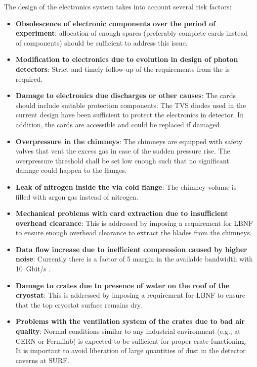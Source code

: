 The design of the \dual electronics system takes into account several risk factors:
\begin{itemize}
\item{\textbf{Obsolescence of electronic components over the period of experiment}: allocation of enough spares (preferably complete cards instead of components) should be sufficient to address this issue. }

\item{\textbf{Modification to  electronics due to evolution in design of photon detectors}: Strict and timely follow-up of the  requirements from the \dual {} is required.}

\item{\textbf{Damage to electronics due  discharges or other causes}: %
The  cards should include suitable protection components. The TVS diodes used in the current design  have been sufficient to protect the electronics in  detector. 
 In addition, the cards are accessible and could be replaced if damaged. }
 
\item{\textbf{Overpressure in the  chimneys}: The  chimneys are equipped with safety valves that vent the excess gas in case of the sudden pressure rise. The overpressure threshold %
shall be set low enough such that no significant damage could happen to the flanges. }

\item{\textbf{Leak of nitrogen inside the  via cold flange}: The chimney volume %
is  filled with argon gas instead of nitrogen.}

\item{\textbf{Mechanical problems with  card extraction due to insufficient overhead clearance}: %
This is addressed by imposing a requirement for LBNF to ensure enough overhead clearance to extract the blades from the  chimneys.}
\item{\textbf{Data flow increase due to inefficient compression caused by higher noise}: Currently there is a factor of \num{5} margin in the available bandwidth with \SI{10}{Gbit/s} .} 
\item{\textbf{Damage to  crates due to presence of water on the roof of the cryostat}: This is addressed by imposing a requirement for LBNF to ensure that the top cryostat surface remains dry.}
\item{\textbf{Problems with the ventilation system of the  crates due to bad air quality}: Normal conditions similar to any industrial environment (e.g., at CERN or Fermilab) %
is expected to be sufficient %
for proper crate functioning. It is important to avoid liberation of large quantities of dust in the detector caverns at SURF.} %
\end{itemize}
